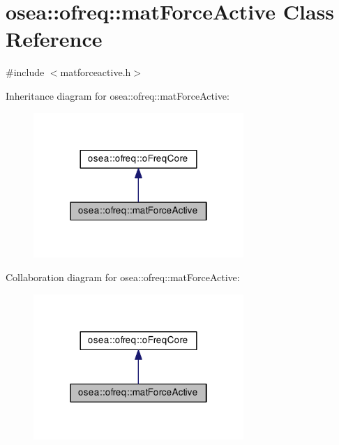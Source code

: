 \hypertarget{classosea_1_1ofreq_1_1mat_force_active}{\section{osea\-:\-:ofreq\-:\-:mat\-Force\-Active Class Reference}
\label{classosea_1_1ofreq_1_1mat_force_active}
}


{\ttfamily \#include $<$matforceactive.\-h$>$}



Inheritance diagram for osea\-:\-:ofreq\-:\-:mat\-Force\-Active\-:\nopagebreak
\begin{figure}[H]
\begin{center}
\leavevmode
\includegraphics[width=226pt]{classosea_1_1ofreq_1_1mat_force_active__inherit__graph}
\end{center}
\end{figure}


Collaboration diagram for osea\-:\-:ofreq\-:\-:mat\-Force\-Active\-:\nopagebreak
\begin{figure}[H]
\begin{center}
\leavevmode
\includegraphics[width=226pt]{classosea_1_1ofreq_1_1mat_force_active__coll__graph}
\end{center}
\end{figure}
